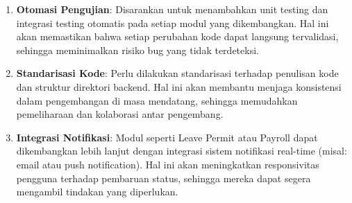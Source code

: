 \begin{enumerate}
	\item \textbf{Otomasi Pengujian}: Disarankan untuk menambahkan unit testing dan integrasi testing otomatis pada setiap modul yang dikembangkan. Hal ini akan memastikan bahwa setiap perubahan kode dapat langsung tervalidasi, sehingga meminimalkan risiko bug yang tidak terdeteksi.
	\item \textbf{Standarisasi Kode}: Perlu dilakukan standarisasi terhadap penulisan kode dan struktur direktori backend. Hal ini akan membantu menjaga konsistensi dalam pengembangan di masa mendatang, sehingga memudahkan pemeliharaan dan kolaborasi antar pengembang.
	\item \textbf{Integrasi Notifikasi}: Modul seperti Leave Permit atau Payroll dapat dikembangkan lebih lanjut dengan integrasi sistem notifikasi real-time (misal: email atau push notification). Hal ini akan meningkatkan responsivitas pengguna terhadap pembaruan status, sehingga mereka dapat segera mengambil tindakan yang diperlukan.
\end{enumerate}